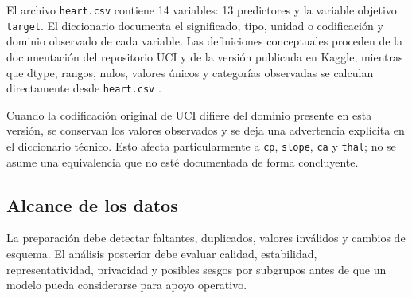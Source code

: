 El archivo \texttt{heart.csv} contiene 14 variables: 13 predictores y la variable objetivo \texttt{target}. El diccionario documenta el significado, tipo, unidad o codificación y dominio observado de cada variable. Las definiciones conceptuales proceden de la documentación del repositorio UCI y de la versión publicada en Kaggle, mientras que dtype, rangos, nulos, valores únicos y categorías observadas se calculan directamente desde \texttt{heart.csv} \parencite{uci-heart-disease,kaggle-heart}.

Cuando la codificación original de UCI difiere del dominio presente en esta versión, se conservan los valores observados y se deja una advertencia explícita en el diccionario técnico. Esto afecta particularmente a \texttt{cp}, \texttt{slope}, \texttt{ca} y \texttt{thal}; no se asume una equivalencia que no esté documentada de forma concluyente.



\subsection{Alcance de los datos}

La preparación debe detectar faltantes, duplicados, valores inválidos y cambios de esquema. El análisis posterior debe evaluar calidad, estabilidad, representatividad, privacidad y posibles sesgos por subgrupos antes de que un modelo pueda considerarse para apoyo operativo.
